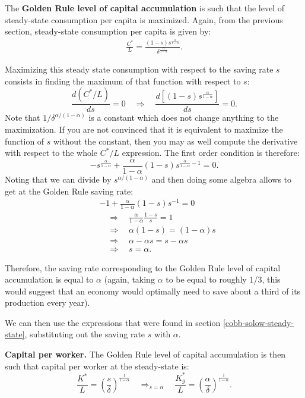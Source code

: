 \documentclass[]{book}
\theoremstyle{definition}
\theoremstyle{definition}
\theoremstyle{definition}
\theoremstyle{remark}
\begin{document}
The \textbf{Golden Rule level of capital accumulation} is such that the
level of steady-state consumption per capita is maximized. Again, from
the previous section, steady-state consumption per capita is given by:
\[
\begin{aligned}
\frac{C^{*}}{L}=\frac{(1-s)s^{\frac{\alpha}{1-\alpha}}}{\delta^{\frac{\alpha}{1-\alpha}}}.
\end{aligned}
\]

Maximizing this steady state consumption with respect to the saving rate
\(s\) consists in finding the maximum of that function with respect to
\(s\):
\[\frac{d\left(C^{*}/L\right)}{ds}=0\quad\Rightarrow\quad\frac{d\left[(1-s)s^{\frac{\alpha}{1-\alpha}}\right]}{ds}=0.\]
Note that \(1/\delta^{\alpha/(1-\alpha)}\) is a constant which does not
change anything to the maximization. If you are not convinced that it is
equivalent to maximize the function of \(s\) without the constant, then
you may as well compute the derivative with respect to the whole
\(C^{*}/L\) expression. The first order condition is therefore:
\[-s^{\frac{\alpha}{1-\alpha}}+\frac{\alpha}{1-\alpha}(1-s)s^{\frac{\alpha}{1-\alpha}-1}=0.\]
Noting that we can divide by \(s^{\alpha/(1-\alpha)}\) and then doing
some algebra allows to get at the Golden Rule saving rate: \[
\begin{aligned}
&-1 + \frac{\alpha}{1-\alpha}(1-s)s^{-1}=0\\
&\quad \Rightarrow\quad\frac{\alpha}{1-\alpha}\frac{1-s}{s}=1\\
&\quad \Rightarrow \quad \alpha(1-s)=(1-\alpha)s\\
&\quad \Rightarrow\quad\alpha-\alpha s=s-\alpha s\\
&\quad\Rightarrow\quad\boxed{s=\alpha}.
\end{aligned}
\]

Therefore, the saving rate corresponding to the Golden Rule level of
capital accumulation is equal to \(\alpha\) (again, taking \(\alpha\) to
be equal to roughly 1/3, this would suggest that an economy would
optimally need to save about a third of its production every year).

We can then use the expressions that were found in section
\ref{cobb-solow-steady-state}, substituting out the saving rate \(s\)
with \(\alpha\).

\textbf{Capital per worker.} The Golden Rule level of capital
accumulation is then such that capital per worker at the steady-state
is:
\[\frac{K^{*}}{L}=\left(\frac{s}{\delta}\right)^{\frac{1}{1-\alpha}}\quad\Rightarrow_{s=\alpha}\quad \boxed{\frac{K^{*}_g}{L}=\left(\frac{\alpha}{\delta}\right)^{\frac{1}{1-\alpha}}}.\]
\end{document}
